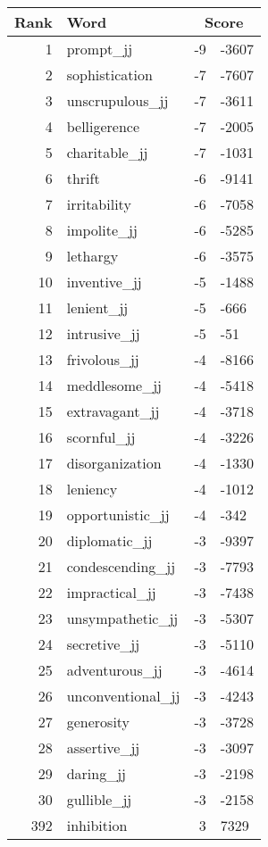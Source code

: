 \begin{longtable}[!htbp]{| rlr@{.}l |}
    \hline
    \textbf{Rank} & \textbf{Word} & \multicolumn{2}{c|}{\textbf{Score}} \\
    \hline
    \endhead
    1 & prompt\_jj & -9 & -3607 \\
    2 & sophistication & -7 & -7607 \\
    3 & unscrupulous\_jj & -7 & -3611 \\
    4 & belligerence & -7 & -2005 \\
    5 & charitable\_jj & -7 & -1031 \\
    6 & thrift & -6 & -9141 \\
    7 & irritability & -6 & -7058 \\
    8 & impolite\_jj & -6 & -5285 \\
    9 & lethargy & -6 & -3575 \\
    10 & inventive\_jj & -5 & -1488 \\
    11 & lenient\_jj & -5 & -666 \\
    12 & intrusive\_jj & -5 & -51 \\
    13 & frivolous\_jj & -4 & -8166 \\
    14 & meddlesome\_jj & -4 & -5418 \\
    15 & extravagant\_jj & -4 & -3718 \\
    16 & scornful\_jj & -4 & -3226 \\
    17 & disorganization & -4 & -1330 \\
    18 & leniency & -4 & -1012 \\
    19 & opportunistic\_jj & -4 & -342 \\
    20 & diplomatic\_jj & -3 & -9397 \\
    21 & condescending\_jj & -3 & -7793 \\
    22 & impractical\_jj & -3 & -7438 \\
    23 & unsympathetic\_jj & -3 & -5307 \\
    24 & secretive\_jj & -3 & -5110 \\
    25 & adventurous\_jj & -3 & -4614 \\
    26 & unconventional\_jj & -3 & -4243 \\
    27 & generosity & -3 & -3728 \\
    28 & assertive\_jj & -3 & -3097 \\
    29 & daring\_jj & -3 & -2198 \\
    30 & gullible\_jj & -3 & -2158 \\
    392 & inhibition & 3 & 7329 \\

\end{longtable}
